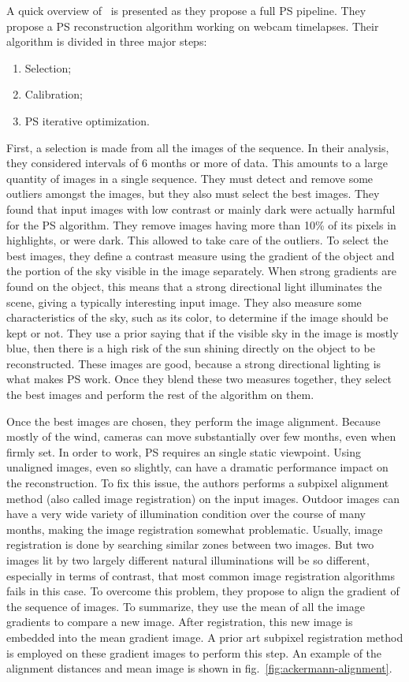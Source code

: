 A quick overview of~\cite{ackermann-cvpr-12} is presented as they propose a full PS pipeline. They propose a PS reconstruction algorithm working on webcam timelapses. Their algorithm is divided in three major steps:
\begin{enumerate}
  \item Selection;
  \item Calibration;
  \item PS iterative optimization.
\end{enumerate}%
First, a selection is made from all the images of the sequence. In their analysis, they considered intervals of 6 months or more of data. This amounts to a large quantity of images in a single sequence. They must detect and remove some outliers amongst the images, but they also must select the best images. They found that input images with low contrast or mainly dark were actually harmful for the PS algorithm. They remove images having more than 10\% of its pixels in highlights, or were dark. This allowed to take care of the outliers. To select the best images, they define a contrast measure using the gradient of the object and the portion of the sky visible in the image separately. When strong gradients are found on the object, this means that a strong directional light illuminates the scene, giving a typically interesting input image. They also measure some characteristics of the sky, such as its color, to determine if the image should be kept or not. They use a prior saying that if the visible sky in the image is mostly blue, then there is a high risk of the sun shining directly on the object to be reconstructed. These images are good, because a strong directional lighting is what makes PS work. Once they blend these two measures together, they select the best images and perform the rest of the algorithm on them.

Once the best images are chosen, they perform the image alignment. Because mostly of the wind, cameras can move substantially over few months, even when firmly set. In order to work, PS requires an single static viewpoint. Using unaligned images, even so slightly, can have a dramatic performance impact on the reconstruction. To fix this issue, the authors performs a subpixel alignment method (also called image registration) on the input images. Outdoor images can have a very wide variety of illumination condition over the course of many months, making the image registration somewhat problematic. Usually, image registration is done by searching similar zones between two images. But two images lit by two largely different natural illuminations will be so different, especially in terms of contrast, that most common image registration algorithms fails in this case. To overcome this problem, they propose to align the gradient of the sequence of images. To summarize, they use the mean of all the image gradients to compare a new image. After registration, this new image is embedded into the mean gradient image. A prior art subpixel registration method is employed on these gradient images to perform this step. An example of the alignment distances and mean image is shown in fig.~\ref{fig:ackermann-alignment}.

